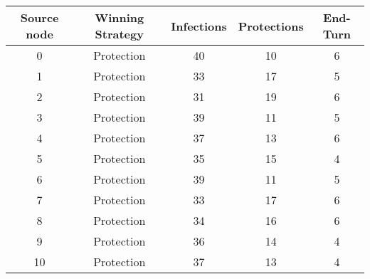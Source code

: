 \documentclass[results.tex]{subfiles}
\begin{document}
    \begin{center}
        \begin{tabular}{| c || c | c | c | c |}
            \hline
            {\bfseries Source node} & {\bfseries Winning Strategy} & {\bfseries Infections} & {\bfseries Protections}
            & {\bfseries End-Turn}
            \\  %
            \hline\hline
            0                       & Protection                   & 40                     & 10                      & 6                    \\
            \hline
            1                       & Protection                   & 33                     & 17                      & 5                    \\
            \hline
            2                       & Protection                   & 31                     & 19                      & 6                    \\
            \hline
            3                       & Protection                   & 39                     & 11                      & 5                    \\
            \hline
            4                       & Protection                   & 37                     & 13                      & 6                    \\
            \hline
            5                       & Protection                   & 35                     & 15                      & 4                    \\
            \hline
            6                       & Protection                   & 39                     & 11                      & 5                    \\
            \hline
            7                       & Protection                   & 33                     & 17                      & 6                    \\
            \hline
            8                       & Protection                   & 34                     & 16                      & 6                    \\
            \hline
            9                       & Protection                   & 36                     & 14                      & 4                    \\
            \hline
            10                      & Protection                   & 37                     & 13                      & 4                    \\

\end{tabular}
\end{center}
\end{document}
